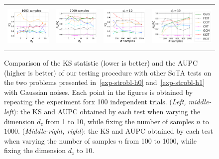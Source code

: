 \begin{figure}[h]
{\label{fig-exp-strobl-type-supp}}
\vspace{-0.5cm}
\end{figure}




\begin{figure}[ht]
\begin{tabular}{cccc} 
\includegraphics[height=2.2cm]{sections/appendix/independence_testing_kernel/new_figures/nsamples_fixed_1000_strobl_dim_1_10_ks.pdf}& \includegraphics[height=2.2cm]{sections/appendix/independence_testing_kernel/new_figures/nsamples_fixed_1000_strobl_dim_1_10_aupc.pdf} & 
\includegraphics[height=2.2cm]{sections/appendix/independence_testing_kernel/new_figures/dim_fixed_10_strobl_ks.pdf}& \includegraphics[height=2.2cm]{sections/appendix/independence_testing_kernel/new_figures/dim_fixed_10_strobl_aupc.pdf} 
\end{tabular}
\caption{Comparison of the KS statistic (lower is better) and the AUPC (higher is better) of our testing procedure with other SoTA tests on the two problems presented in~\eqref{exp-strobl-h0} and~\eqref{exp-strobl-h1}  with Gaussian noises. Each point in the figures is obtained by repeating the experiment forx 100 independent trials. (\emph{Left, middle-left}): the KS and AUPC obtained by each test when varying the dimension $d_z$ from 1 to 10, while fixing the number of samples $n$ to $1000$. (\emph{Middle-right, right}): the KS and AUPC obtained by each test when varying the number of samples $n$ from 100 to 1000, while fixing the dimension $d_z$ to $10$. 
\label{fig-exp-strobl-ks-supp}}
\vspace{-0.5cm}
\end{figure}




